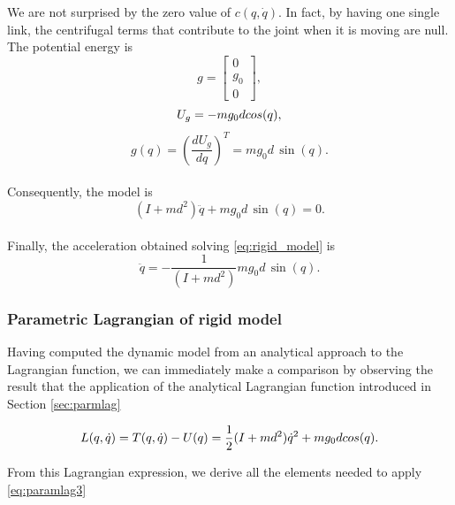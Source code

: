 \documentclass[a4paper]{article}
\begin{document}
We are not surprised by the zero value of $c(q,\dot{q})$. In fact, by having one single link, the centrifugal terms that contribute to the joint when it is moving are null.\\

The potential energy is
\begin{equation}
    \nonumber
    g=\begin{bmatrix}
        0 \\
        g_0 \\
        0
    \end{bmatrix},
\end{equation}
\begin{equation}
    \nonumber
    U_g=-mg_0d\, \\cos(q),
\end{equation}
\begin{equation}
    \label{eq:gravity}
    g(q)=\left(\frac{dU_g}{dq}\right)^T=mg_0d\, \sin(q).
\end{equation} \\

Consequently, the model is
\begin{equation}
\label{eq:rigid_model}
    (I+md^2)\ddot{q}+mg_0d\, \sin(q)=0.
\end{equation} \\

Finally, the acceleration obtained solving \eqref{eq:rigid_model} is
\begin{equation}
\label{eq:classical_rigid_acc}
    \ddot{q}=-\frac{1}{(I+md^2)}mg_0d\, \sin(q).
\end{equation}

\subsubsection{Parametric Lagrangian of rigid model}
Having computed the dynamic model from an analytical approach to the Lagrangian function, we can immediately make a comparison by observing the result that the application of the analytical Lagrangian function introduced in Section \ref{sec:parmlag}

\begin{equation}
    \label{eq:rig_eul_lag}
    \nonumber
    L(q,\dot{q}) = T(q,\dot{q}) - U(q) = \frac{1}{2}(I+md^2)\dot{q}^2 + mg_0d\, \\cos(q) .
\end{equation}

From this Lagrangian expression, we derive all the elements needed to apply \eqref{eq:paramlag3}
\end{document}
